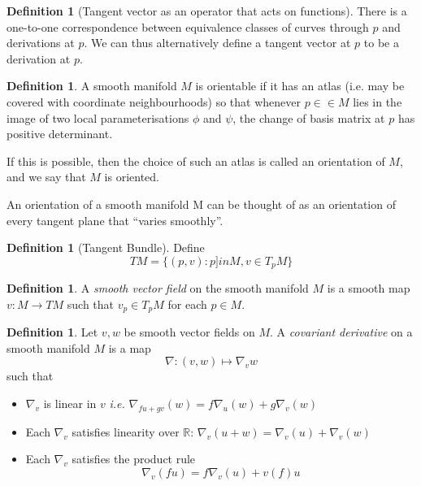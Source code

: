 \documentclass[10pt, oneside, reqno]{amsart}
\newcommand{\R}{\mathbb{R}}
\theoremstyle{plain}%
\theoremstyle{definition}
\newtheorem{defn}[thm]{Definition}
\theoremstyle{remark}
\begin{document}
\begin{defn}[Tangent vector as an operator that acts on functions]
    There is a one-to-one correspondence between equivalence classes of curves through $p$ and derivations at $p$.  We can thus alternatively define a tangent vector at $p$ to be a derivation at $p$.  
\end{defn}

\begin{defn}
    A smooth manifold $M$ is orientable if it has an atlas (i.e. may be covered with coordinate neighbourhoods) so that whenever $p ∈\in M$ lies in the image of two local parameterisations $\phi$ and $\psi$, the change of basis matrix at $p$ has positive determinant.
    
    If this is possible, then the choice of such an atlas is called an orientation of $M$, and we say that $M$ is oriented.
    
    An orientation of a smooth manifold M can be thought of as an orientation of every tangent plane that “varies smoothly”.
\end{defn}

\begin{defn}[Tangent Bundle]
Define \[
    TM = \{ (p,v): p ]in M, v \in T_p M \}
\]
\end{defn}

\begin{defn}
    A \emph{smooth vector field} on the smooth manifold $M$ is a smooth map $v : M \rightarrow TM$ such that $v_p \in T_pM$ for each $p \in M$.
\end{defn}

\begin{defn}
    Let $v,w$ be smooth vector fields on $M$.  A \emph{covariant derivative} on a smooth manifold $M$ is a map \[
        \nabla : (v,w) \mapsto \nabla_v w
    \] 
such that 
\begin{itemize}


    \item $\nabla_v$ is linear in $v$ \emph{i.e.} $\nabla_{fu + gv}(w) = f \nabla_u(w) + g \nabla_v(w)$


    \item Each $\nabla_v$ satisfies linearity over $\R$: $\nabla_v(u +w) = \nabla_v(u) + \nabla_v(w)$


    \item Each $\nabla_v$ satisfies the product rule \[
    \nabla_v (fu) = f \nabla_v(u) + v(f) u
 \]

\end{itemize}
\end{defn}
\end{document}
